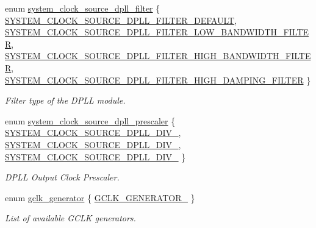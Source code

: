 \begin{DoxyCompactItemize}
enum \hyperlink{group__asfdoc__sam0__system__clock__group_ga0948d16df62f85d2828679fe7ac71059}{system\+\_\+clock\+\_\+source\+\_\+dpll\+\_\+filter} \{ \hyperlink{group__asfdoc__sam0__system__clock__group_gga0948d16df62f85d2828679fe7ac71059a9d6b6666eb823c73f9e9b9993b766fdf}{S\+Y\+S\+T\+E\+M\+\_\+\+C\+L\+O\+C\+K\+\_\+\+S\+O\+U\+R\+C\+E\+\_\+\+D\+P\+L\+L\+\_\+\+F\+I\+L\+T\+E\+R\+\_\+\+D\+E\+F\+A\+U\+L\+T}, 
\hyperlink{group__asfdoc__sam0__system__clock__group_gga0948d16df62f85d2828679fe7ac71059a395751739f91c8c6309586e1d01a3c5a}{S\+Y\+S\+T\+E\+M\+\_\+\+C\+L\+O\+C\+K\+\_\+\+S\+O\+U\+R\+C\+E\+\_\+\+D\+P\+L\+L\+\_\+\+F\+I\+L\+T\+E\+R\+\_\+\+L\+O\+W\+\_\+\+B\+A\+N\+D\+W\+I\+D\+T\+H\+\_\+\+F\+I\+L\+T\+E\+R}, 
\hyperlink{group__asfdoc__sam0__system__clock__group_gga0948d16df62f85d2828679fe7ac71059aaca5282866a9196d026bccb4a6cac299}{S\+Y\+S\+T\+E\+M\+\_\+\+C\+L\+O\+C\+K\+\_\+\+S\+O\+U\+R\+C\+E\+\_\+\+D\+P\+L\+L\+\_\+\+F\+I\+L\+T\+E\+R\+\_\+\+H\+I\+G\+H\+\_\+\+B\+A\+N\+D\+W\+I\+D\+T\+H\+\_\+\+F\+I\+L\+T\+E\+R}, 
\hyperlink{group__asfdoc__sam0__system__clock__group_gga0948d16df62f85d2828679fe7ac71059aa472aa5b443f1fccc0b7204b0ac47f65}{S\+Y\+S\+T\+E\+M\+\_\+\+C\+L\+O\+C\+K\+\_\+\+S\+O\+U\+R\+C\+E\+\_\+\+D\+P\+L\+L\+\_\+\+F\+I\+L\+T\+E\+R\+\_\+\+H\+I\+G\+H\+\_\+\+D\+A\+M\+P\+I\+N\+G\+\_\+\+F\+I\+L\+T\+E\+R}
 \}
\begin{DoxyCompactList}\small\item\em Filter type of the D\+P\+L\+L module. \end{DoxyCompactList}\item 
enum \hyperlink{group__asfdoc__sam0__system__clock__group_ga1da00bfdf7ce6ad4695da16eabb9a1ed}{system\+\_\+clock\+\_\+source\+\_\+dpll\+\_\+prescaler} \{ \hyperlink{group__asfdoc__sam0__system__clock__group_gga1da00bfdf7ce6ad4695da16eabb9a1eda08b39d98ca8e0264a07f41e106677ef7}{S\+Y\+S\+T\+E\+M\+\_\+\+C\+L\+O\+C\+K\+\_\+\+S\+O\+U\+R\+C\+E\+\_\+\+D\+P\+L\+L\+\_\+\+D\+I\+V\+\_}, 
\hyperlink{group__asfdoc__sam0__system__clock__group_gga1da00bfdf7ce6ad4695da16eabb9a1eda2475b7e397dfedf8a18f8fb6a4fcec56}{S\+Y\+S\+T\+E\+M\+\_\+\+C\+L\+O\+C\+K\+\_\+\+S\+O\+U\+R\+C\+E\+\_\+\+D\+P\+L\+L\+\_\+\+D\+I\+V\+\_}, 
\hyperlink{group__asfdoc__sam0__system__clock__group_gga1da00bfdf7ce6ad4695da16eabb9a1eda3553647335810ce0d455c054706c98fb}{S\+Y\+S\+T\+E\+M\+\_\+\+C\+L\+O\+C\+K\+\_\+\+S\+O\+U\+R\+C\+E\+\_\+\+D\+P\+L\+L\+\_\+\+D\+I\+V\+\_}
 \}
\begin{DoxyCompactList}\small\item\em D\+P\+L\+L Output Clock Prescaler. \end{DoxyCompactList}\item 
enum \hyperlink{group__asfdoc__sam0__system__clock__group_ga1ab9bb87560ad127ed982591b7d67311}{gclk\+\_\+generator} \{ \hyperlink{group__asfdoc__sam0__system__clock__group_gga1ab9bb87560ad127ed982591b7d67311a66f60c7b34b5fc16a9845d83370f7231}{G\+C\+L\+K\+\_\+\+G\+E\+N\+E\+R\+A\+T\+O\+R\+\_}
 \}
\begin{DoxyCompactList}\small\item\em List of available G\+C\+L\+K generators. \end{DoxyCompactList}\end{DoxyCompactItemize}
